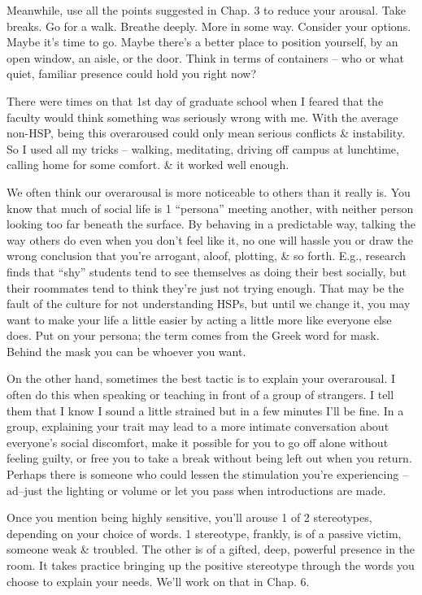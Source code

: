 \documentclass{article}
\numberwithin{equation}{section}
\begin{document}
Meanwhile, use all the points suggested in Chap. 3 to reduce your arousal. Take breaks. Go for a walk. Breathe deeply. More in some way. Consider your options. Maybe it's time to go. Maybe there's a better place to position yourself, by an open window, an aisle, or the door. Think in terms of containers -- who or what quiet, familiar presence could hold you right now?

There were times on that 1st day of graduate school when I feared that the faculty would think something was seriously wrong with me. With the average non-HSP, being this overaroused could only mean serious conflicts \& instability. So I used all my tricks -- walking, meditating, driving off campus at lunchtime, calling home for some comfort. \& it worked well enough.

We often think our overarousal is more noticeable to others than it really is. You know that much of social life is 1 ``persona'' meeting another, with neither person looking too far beneath the surface. By behaving in a predictable way, talking the way others do even when you don't feel like it, no one will hassle you or draw the wrong conclusion that you're arrogant, aloof, plotting, \& so forth. E.g., research finds that ``shy'' students tend to see themselves as doing their best socially, but their roommates tend to think they're just not trying enough. That may be the fault of the culture for not understanding HSPs, but until we change it, you may want to make your life a little easier by acting a little more like everyone else does. Put on your persona; the term comes from the Greek word for mask. Behind the mask you can be whoever you want.

On the other hand, sometimes the best tactic is to explain your overarousal. I often do this when speaking or teaching in front of a group of strangers. I tell them that I know I sound a little strained but in a few minutes I'll be fine. In a group, explaining your trait may lead to a more intimate conversation about everyone's social discomfort, make it possible for you to go off alone without feeling guilty, or free you to take a break without being left out when you return. Perhaps there is someone who could lessen the stimulation you're experiencing -- ad--just the lighting or volume or let you pass when introductions are made.

Once you mention being highly sensitive, you'll arouse 1 of 2 stereotypes, depending on your choice of words. 1 stereotype, frankly, is of a passive victim, someone weak \& troubled. The other is of a gifted, deep, powerful presence in the room. It takes practice bringing up the positive stereotype through the words you choose to explain your needs. We'll work on that in Chap. 6.
\end{document}
